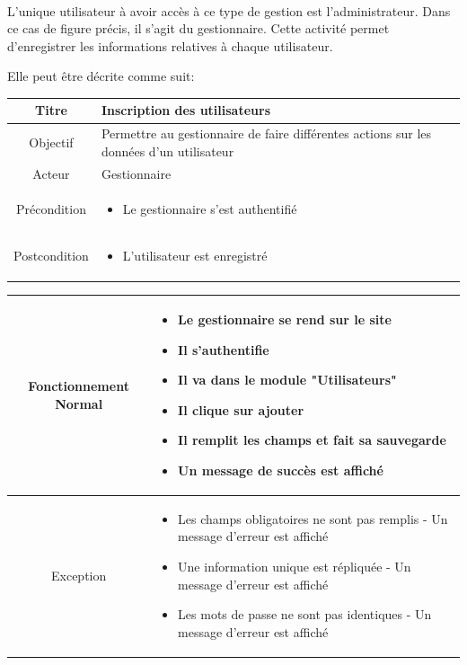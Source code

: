 \paragraph{}
L'unique utilisateur à avoir accès à ce type de gestion est l'administrateur. Dans 
ce cas de figure précis, il s'agit du gestionnaire. Cette activité 
permet d'enregistrer les informations relatives à chaque utilisateur. \par 
Elle peut être décrite comme suit: \par 
\begin{tabular}{|c|p{7cm}|}
        \hline
        Titre & Inscription des utilisateurs \\
        \hline
        Objectif & Permettre au gestionnaire de faire différentes actions sur les données d'un utilisateur \\
        \hline
        Acteur & Gestionnaire \\
        \hline
        Précondition & \begin{itemize}
                \item Le gestionnaire s'est authentifié 
        \end{itemize} \\
        \hline
        Postcondition & \begin{itemize}
                \item L'utilisateur est enregistré 
        \end{itemize} \\
        \hline
\end{tabular}
\par 
\begin{tabular}{|c|p{7cm}|}
        \hline
        Fonctionnement Normal & \begin{itemize}
                \item Le gestionnaire se rend sur le site
                \item Il s'authentifie
                \item Il va dans le module "Utilisateurs"
                \item Il clique sur ajouter
                \item Il remplit les champs et fait sa sauvegarde
                \item Un message de succès est affiché
        \end{itemize} \\
        \hline
        Exception & \begin{itemize}
                \item Les champs obligatoires ne sont pas remplis - Un message d'erreur est affiché
                \item Une information unique est répliquée - Un message d'erreur est affiché
                \item Les mots de passe ne sont pas identiques - Un message d'erreur est affiché
        \end{itemize} \\
        \hline
\end{tabular}


